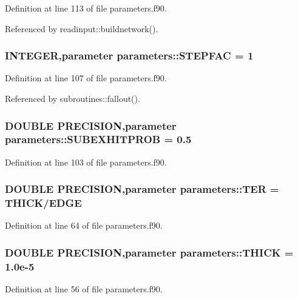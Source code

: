 Definition at line 113 of file parameters.f90.

Referenced by readinput::buildnetwork().\hypertarget{namespaceparameters_a2ec73288039fb063a8606dd185f2d6ff}{
\subsubsection[{STEPFAC}]{\setlength{\rightskip}{0pt plus 5cm}INTEGER,parameter {\bf parameters::STEPFAC} = 1}}
\label{namespaceparameters_a2ec73288039fb063a8606dd185f2d6ff}


Definition at line 107 of file parameters.f90.

Referenced by subroutines::fallout().\hypertarget{namespaceparameters_a29056f19e30fd6e33712abbfdcff3f1b}{
\subsubsection[{SUBEXHITPROB}]{\setlength{\rightskip}{0pt plus 5cm}DOUBLE PRECISION,parameter {\bf parameters::SUBEXHITPROB} = 0.5}}
\label{namespaceparameters_a29056f19e30fd6e33712abbfdcff3f1b}


Definition at line 103 of file parameters.f90.\hypertarget{namespaceparameters_adc91f63a6d2c197941c445a5d64800a3}{
\subsubsection[{TER}]{\setlength{\rightskip}{0pt plus 5cm}DOUBLE PRECISION,parameter {\bf parameters::TER} = {\bf THICK}/{\bf EDGE}}}
\label{namespaceparameters_adc91f63a6d2c197941c445a5d64800a3}


Definition at line 64 of file parameters.f90.\hypertarget{namespaceparameters_aacbd355b27d7e7459076fdf3f77fab20}{
\subsubsection[{THICK}]{\setlength{\rightskip}{0pt plus 5cm}DOUBLE PRECISION,parameter {\bf parameters::THICK} = 1.0e-\/5}}
\label{namespaceparameters_aacbd355b27d7e7459076fdf3f77fab20}


Definition at line 56 of file parameters.f90.

